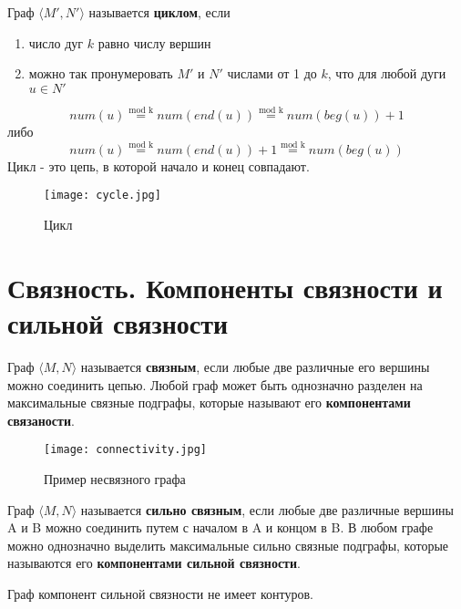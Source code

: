 \vspace{3mm}

Граф $\langle M', N'\rangle$ называется \textbf{циклом}, если
\begin{enumerate}
    \item число дуг $k$ равно числу вершин
    \item можно так пронумеровать $M'$ и $N'$ числами от 1 до $k$, что для любой дуги $u \in N'$
\end{enumerate}
\begin{equation}
    num(u) \stackrel{\text{mod k}}{=} num(end(u)) \stackrel{\text{mod k}}{=} num(beg(u)) + 1
\end{equation}
либо
\begin{equation}
    num(u) \stackrel{\text{mod k}}{=} num(end(u)) + 1 \stackrel{\text{mod k}}{=} num(beg(u))
\end{equation}
Цикл - это цепь, в которой начало и конец совпадают.
\begin{figure}[h]
    \centering 
    \texttt{[image: cycle.jpg]}
    \caption{Цикл}
\end{figure}

\section{Связность. Компоненты связности и сильной связности}
Граф $\langle M, N\rangle$ называется \textbf{связным}, если любые две различные его
вершины можно соединить цепью. Любой граф может быть однозначно разделен на максимальные
связные подграфы, которые называют его \textbf{компонентами связаности}.
\begin{figure}[h]
    \centering 
    \texttt{[image: connectivity.jpg]}
    \caption{Пример несвязного графа}
\end{figure}

Граф $\langle M, N\rangle$ называется \textbf{сильно связным}, если любые две различные
вершины A и B можно соединить путем с началом в A и концом в B. В любом графе можно однозначно
выделить максимальные сильно связные подграфы, которые называются его \textbf{компонентами сильной связности}.
\begin{thm}
    Граф компонент сильной связности не имеет контуров.
\end{thm}
